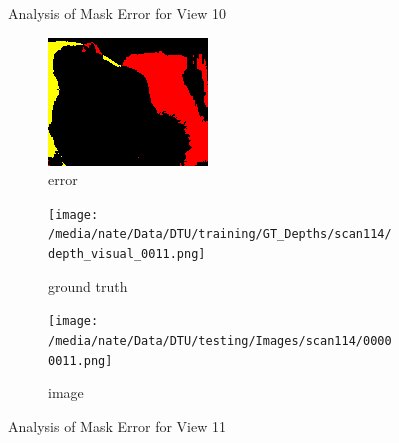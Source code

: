 \documentclass{article}
\begin{document}
\begin{figure}
\begin{subfigure}{0.3\textwidth}
		\label{fig:img10}
	\end{subfigure}
	\hfill
	\caption{Analysis of Mask Error for View 10}
	\label{fig:error_analys10}
\end{figure}\begin{figure}
	\centering
	\begin{subfigure}{0.3\textwidth}
		\centering
		\includegraphics[width=\textwidth]{./output/011_error.png}
		\caption{error}
		\label{fig:error11}
	\end{subfigure}
	\hfill
	\centering
	\begin{subfigure}{0.3\textwidth}
		\centering
		\texttt{[image: /media/nate/Data/DTU/training/GT\_Depths/scan114/depth\_visual\_0011.png]}
		\caption{ground truth}
		\label{fig:gt11}
	\end{subfigure}
	\hfill
	\centering
	\begin{subfigure}{0.3\textwidth}
		\centering
		\texttt{[image: /media/nate/Data/DTU/testing/Images/scan114/00000011.png]}
		\caption{image}
		\label{fig:img11}
	\end{subfigure}
	\hfill
	\caption{Analysis of Mask Error for View 11}
	\label{fig:error_analys11}
\end{figure}\begin{figure}
	\centering
	\begin{subfigure}{0.3\textwidth}
		\centering

\end{subfigure}
\end{figure}
\end{document}
